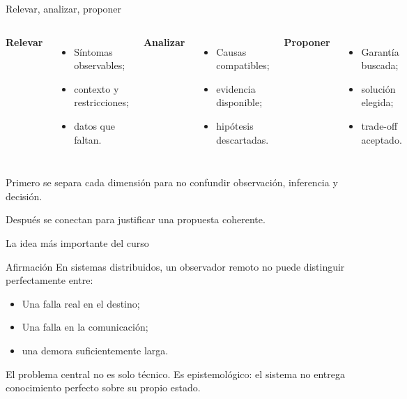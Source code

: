 \documentclass[institutional,screen,none]{ua-engineering-v6-beamer}
\begin{document}
\begin{frame}{Relevar, analizar, proponer}
\begin{columns}[T]
\textbf{Relevar}
\begin{itemize}
\item Síntomas observables;
\item contexto y restricciones;
\item datos que faltan.
\end{itemize}

\textbf{Analizar}
\begin{itemize}
\item Causas compatibles;
\item evidencia disponible;
\item hipótesis descartadas.
\end{itemize}

\textbf{Proponer}
\begin{itemize}
\item Garantía buscada;
\item solución elegida;
\item trade-off aceptado.
\end{itemize}
\end{columns}

\vspace{0.5em}
\begin{uainfo}
Primero se separa cada dimensión para no confundir observación, inferencia y decisión. 

Después se conectan para justificar una propuesta coherente.
\end{uainfo}
\end{frame}


\begin{frame}{La idea más importante del curso}
\begin{block}{Afirmación}
En sistemas distribuidos, un observador remoto no puede distinguir perfectamente entre:
\end{block}

\begin{itemize}
\item Una falla real en el destino;
\item Una falla en la comunicación;
\item una demora suficientemente larga.
\end{itemize}

\pause

\begin{uakeybox}
El problema central no es solo técnico.
Es epistemológico: el sistema no entrega conocimiento perfecto sobre su propio estado.
\end{uakeybox}
\end{frame}
\end{document}

